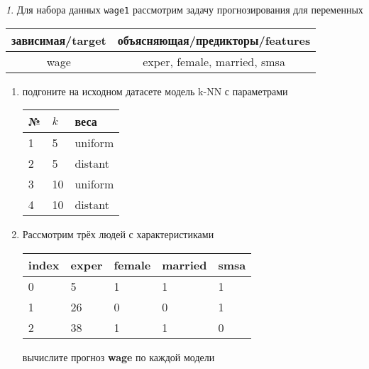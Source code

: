 \documentclass[12pt]{article}
\theoremstyle{remark}
\newtheorem{exercise}{}[section]
\begin{document}
\begin{exercise}
Для набора данных \texttt{wage1} рассмотрим задачу прогнозирования
для переменных
\begin{center}
	\begin{tabular}{|c|c|}\hline
		зависимая/target & объясняющая/предикторы/features \\ \hline
		wage & exper, female, married, smsa \\ \hline
	\end{tabular}
\end{center}
\begin{enumerate}
	\item подгоните на исходном датасете модель k-NN с параметрами
	\begin{center}
		\begin{tabular}{|l|l|l|}\hline
		№ & \(k\) & веса \\ \hline
		1 & 5 & uniform \\
		2 & 5 & distant \\
		3 & 10 & uniform \\
		4 & 10 & distant \\ \hline
		\end{tabular}
	\end{center}
	\item Рассмотрим трёх людей с характеристиками
	\begin{center}
		\begin{tabular}{|l||l|l|l|l|}\hline
			index & exper & female & married & smsa \\ \hline\hline
			0 & 5 & 1 & 1 & 1  \\
			1 & 26 & 0 & 0 & 1 \\
			2 & 38 & 1 & 1 & 0 \\ \hline
		\end{tabular}
	\end{center}
	вычислите прогноз \textbf{wage} по каждой модели
\end{enumerate}
\end{exercise}
\end{document}
